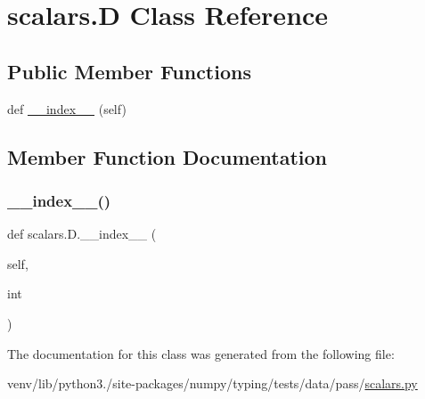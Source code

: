 \hypertarget{classscalars_1_1D}{}\section{scalars.\+D Class Reference}
\label{classscalars_1_1D}
\subsection*{Public Member Functions}
\begin{DoxyCompactItemize}
\item 
def \hyperlink{classscalars_1_1D_af6c05d6d93c31e3a5f0e2c593f4a90b5}{\+\_\+\+\_\+index\+\_\+\+\_\+} (self)
\end{DoxyCompactItemize}


\subsection{Member Function Documentation}
\mbox{\label{classscalars_1_1D_af6c05d6d93c31e3a5f0e2c593f4a90b5}} 
\subsubsection{\texorpdfstring{\+\_\+\+\_\+index\+\_\+\+\_\+()}{\_\_index\_\_()}}
{\footnotesize\ttfamily def scalars.\+D.\+\_\+\+\_\+index\+\_\+\+\_\+ (\begin{DoxyParamCaption}\item[{}]{self,  }\item[{}]{int }\end{DoxyParamCaption})}



The documentation for this class was generated from the following file\+:\begin{DoxyCompactItemize}
\item 
venv/lib/python3./site-\/packages/numpy/typing/tests/data/pass/\hyperlink{pass_2scalars_8py}{scalars.\+py}\end{DoxyCompactItemize}

